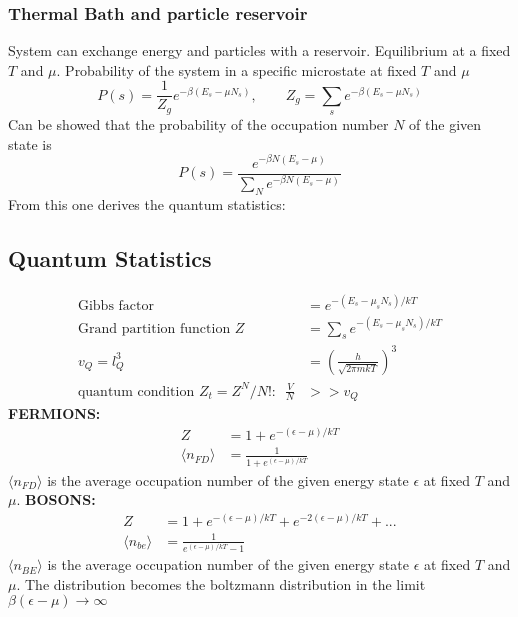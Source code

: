 \documentclass[a4paper, norsk, 8pt]{article}
\begin{document}
\begin{multicols*}{3}
\subsubsection*{\scriptsize Thermal Bath and particle reservoir}
System can exchange energy and particles with a reservoir. Equilibrium at a fixed $T$ and $\mu$. Probability of the system in a specific microstate at fixed $T$ and $\mu$
\begin{equation*}
  P(s) = \frac{1}{Z_g}e^{-\beta \left( E_s-\mu N_s \right)}, \qquad Z_g = \sum_s e^{-\beta \left(E_s-\mu N_s \right) }
\end{equation*}
Can be showed that the probability of the occupation number $N$ of the given state is
\begin{equation*}
  P(s) = \frac{e^{-\beta N \left( E_s-\mu  \right)}}{\sum_{N} e^{-\beta N \left( E_s-\mu  \right)}}
\end{equation*}
From this one derives the quantum statistics:
\subsection*{\footnotesize  Quantum Statistics}
\begin{align*}
    \text{Gibbs factor} &= e^{-(E_s - \mu_{s} N_{s})/kT} \\
    \text{Grand partition function}\,\, Z &= \sum_s e^{-(E_s - \mu_s N_s)/kT} \\
    v_Q = l_Q^3 &= \left( \frac{h}{\sqrt{2\pi mkT}} \right)^3 \\
    \text{quantum condition $Z_t=Z^N/N!$:}\,\,\,\, \frac{V}{N} &>> v_Q
\end{align*}
\textbf{\textsc{FERMIONS:}}
\begin{align*}
    Z &= 1 + e^{-(\epsilon-\mu)/kT} \\
    \langle n_{FD} \rangle &= \frac{1}{1+e^{(\epsilon-\mu)/kT}}
\end{align*}
$  \langle n_{FD} \rangle $ is the average occupation number of the given	energy state $\epsilon$ at fixed $T$ and $\mu$.
\textbf{\textsc{BOSONS:}}
\begin{align*}
    Z &= 1 + e^{-(\epsilon-\mu)/kT} + e^{-2(\epsilon-\mu)/kT} + ... \\
    \langle n_{be} \rangle &= \frac{1}{e^{(\epsilon-\mu)/kT}-1}
\end{align*}
$  \langle n_{BE} \rangle $ is the average occupation number of the given	energy state $\epsilon$ at fixed $T$ and $\mu$.
The distribution becomes the boltzmann distribution in the limit $\beta\left( \epsilon - \mu \right) \rightarrow \infty $

\end{multicols*}
\end{document}
